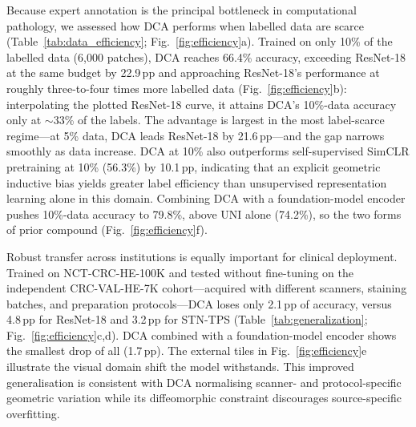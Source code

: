 \documentclass[pdflatex,sn-nature]{sn-jnl}%
\theoremstyle{thmstyleone}%
\theoremstyle{thmstyletwo}%
\theoremstyle{thmstylethree}%
\begin{document}
Because expert annotation is the principal bottleneck in computational pathology,
we assessed how DCA performs when labelled data are scarce
(Table~\ref{tab:data_efficiency}; Fig.~\ref{fig:efficiency}a). Trained on only
10\% of the labelled data (6{,}000 patches), DCA reaches 66.4\% accuracy,
exceeding ResNet-18 at the same budget by 22.9\,pp and approaching ResNet-18's
performance at roughly three-to-four times more labelled data
(Fig.~\ref{fig:efficiency}b): interpolating the plotted ResNet-18 curve, it
attains DCA's 10\%-data accuracy only at $\sim$33\% of the labels. The advantage
is largest in the most label-scarce regime---at 5\% data, DCA leads ResNet-18 by
21.6\,pp---and the gap narrows smoothly as data increase. DCA at 10\% also
outperforms self-supervised SimCLR pretraining at 10\% (56.3\%) by 10.1\,pp,
indicating that an explicit geometric inductive bias yields greater label
efficiency than unsupervised representation learning alone in this domain.
Combining DCA with a foundation-model encoder pushes 10\%-data accuracy to 79.8\%,
above UNI alone (74.2\%), so the two forms of prior compound
(Fig.~\ref{fig:efficiency}f).

Robust transfer across institutions is equally important for clinical
deployment. Trained on NCT-CRC-HE-100K and tested without fine-tuning on the
independent CRC-VAL-HE-7K cohort---acquired with different scanners, staining
batches, and preparation protocols---DCA loses only 2.1\,pp of accuracy, versus
4.8\,pp for ResNet-18 and 3.2\,pp for STN-TPS (Table~\ref{tab:generalization};
Fig.~\ref{fig:efficiency}c,d). DCA combined with a foundation-model encoder shows
the smallest drop of all (1.7\,pp). The external tiles in
Fig.~\ref{fig:efficiency}e illustrate the visual domain shift the model
withstands. This improved generalisation is consistent with DCA normalising
scanner- and protocol-specific geometric variation while its diffeomorphic
constraint discourages source-specific overfitting.
\end{document}
